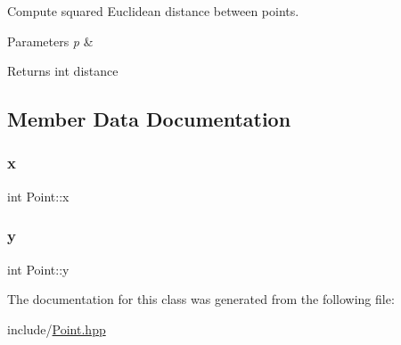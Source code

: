Compute squared Euclidean distance between points. 


\begin{DoxyParams}{Parameters}
{\em p} & \\
\hline
\end{DoxyParams}
\begin{DoxyReturn}{Returns}
int distance 
\end{DoxyReturn}


\subsection{Member Data Documentation}
\mbox{\label{classPoint_a8c779e11e694b20e0946105a9f5de842}} 
\subsubsection{\texorpdfstring{x}{x}}
{\footnotesize\ttfamily int Point\+::x}

\mbox{\label{classPoint_a2e1b5fb2b2a83571f5c0bc0f66a73cf7}} 
\subsubsection{\texorpdfstring{y}{y}}
{\footnotesize\ttfamily int Point\+::y}



The documentation for this class was generated from the following file\+:\begin{DoxyCompactItemize}
\item 
include/\mbox{\hyperlink{Point_8hpp}{Point.\+hpp}}\end{DoxyCompactItemize}
